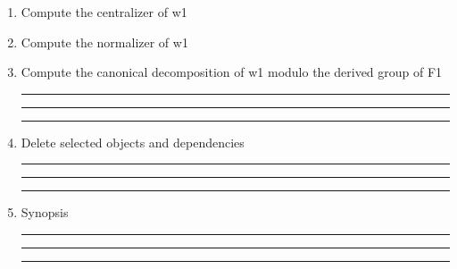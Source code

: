 \begin{enumerate}
\bigskip
\hrule\hrule\hrule

\item Compute the centralizer of w1

\item Compute the normalizer of w1

\item Compute the canonical decomposition of w1 modulo the derived
group of F1

\bigskip
\hrule\hrule\hrule

\item Delete selected objects and dependencies

\bigskip
\hrule\hrule\hrule

\item
Synopsis

\bigskip
\hrule\hrule\hrule

\end{enumerate}
